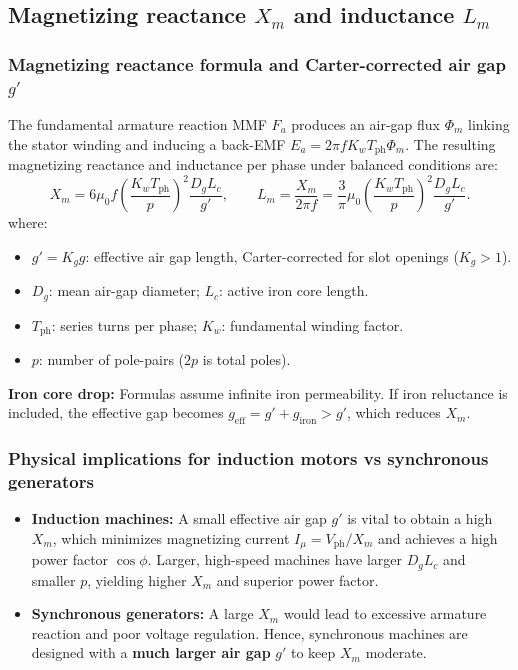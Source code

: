\subsection{Magnetizing reactance $X_m$ and inductance $L_m$}

\subsubsection{Magnetizing reactance formula and Carter-corrected air gap $g'$}
The fundamental armature reaction MMF \(F_a\) produces an air-gap flux \(\Phi_m\) linking the stator winding and inducing a back-EMF \(E_a = 2\pi f K_w T_{\mathrm{ph}} \Phi_m\).
The resulting magnetizing reactance and inductance per phase under balanced conditions are:
\[
X_m = 6\mu_0 f\left(\frac{K_w T_{\mathrm{ph}}}{p}\right)^2\frac{D_g L_c}{g'},
\qquad
L_m = \frac{X_m}{2\pi f} = \frac{3}{\pi}\mu_0\left(\frac{K_w T_{\mathrm{ph}}}{p}\right)^2\frac{D_g L_c}{g'}.
\]
where:
\begin{itemize}
  \item \(g' = K_g g\): effective air gap length, Carter-corrected for slot openings (\(K_g > 1\)).
  \item \(D_g\): mean air-gap diameter; \(L_c\): active iron core length.
  \item \(T_{\mathrm{ph}}\): series turns per phase; \(K_w\): fundamental winding factor.
  \item \(p\): number of pole-pairs (\(2p\) is total poles).
\end{itemize}
\textbf{Iron core drop:} Formulas assume infinite iron permeability. If iron reluctance is included, the effective gap becomes \(g_{\mathrm{eff}} = g' + g_{\mathrm{iron}} > g'\), which reduces \(X_m\).

\subsubsection{Physical implications for induction motors vs synchronous generators}
\begin{itemize}
  \item \textbf{Induction machines:} A small effective air gap \(g'\) is vital to obtain a high \(X_m\), which minimizes magnetizing current \(I_\mu = V_{\mathrm{ph}}/X_m\) and achieves a high power factor \(\cos\phi\). Larger, high-speed machines have larger \(D_g L_c\) and smaller \(p\), yielding higher \(X_m\) and superior power factor.
  \item \textbf{Synchronous generators:} A large \(X_m\) would lead to excessive armature reaction and poor voltage regulation. Hence, synchronous machines are designed with a \textbf{much larger air gap} \(g'\) to keep \(X_m\) moderate.
\end{itemize}

